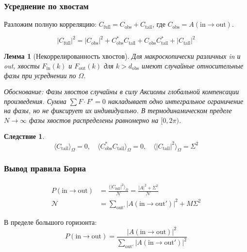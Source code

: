 \documentclass[12pt,a4paper]{article}
\newtheorem{lemma}{Лемма}[section]
\newtheorem{corollary}{Следствие}[section]
\begin{document}
\subsubsection{Усреднение по хвостам}

Разложим полную корреляцию: $C_{\text{full}} = C_{\text{obs}} + C_{\text{tail}}$, где $C_{\text{obs}} = A(\text{in} \to \text{out})$.

\begin{equation}
    |C_{\text{full}}|^2 = |C_{\text{obs}}|^2 + C_{\text{obs}}^* C_{\text{tail}} + C_{\text{obs}} C_{\text{tail}}^* + |C_{\text{tail}}|^2
\end{equation}

\begin{lemma}[Некоррелированность хвостов]
Для макроскопически различных in и out, хвосты $F_{\text{in}}(k)$ и $F_{\text{out}}(k)$ для $k > d_{\text{obs}}$ имеют случайные относительные фазы при усреднении по $\Omega$.

Обоснование: Фазы хвостов случайны в силу Аксиомы глобальной компенсации произведения. Сумма $\sum F \cdot F' = 0$ накладывает одно интегральное ограничение на фазы, но не фиксирует их индивидуально. В термодинамическом пределе $N \to \infty$ фазы хвостов распределены равномерно на $[0, 2\pi)$.
\end{lemma}

\begin{corollary}
\begin{equation}
    \langle C_{\text{tail}} \rangle_\Omega = 0, \quad \langle C_{\text{obs}}^* C_{\text{tail}} \rangle_\Omega = 0, \quad \langle |C_{\text{tail}}|^2 \rangle_\Omega = \Sigma^2
\end{equation}
\end{corollary}

\subsubsection{Вывод правила Борна}

\begin{align}
    P(\text{in} \to \text{out}) &= \frac{\langle |C_{\text{full}}|^2 \rangle_\Omega}{\mathcal{N}} = \frac{|A|^2 + \Sigma^2}{\mathcal{N}} \\
    \mathcal{N} &= \sum_{\text{out}'} |A(\text{in} \to \text{out}')|^2 + M\Sigma^2
\end{align}

В пределе большого горизонта:
\begin{equation}
    \boxed{P(\text{in} \to \text{out}) = \frac{|A(\text{in} \to \text{out})|^2}{\sum_{\text{out}'} |A(\text{in} \to \text{out}')|^2}}
\end{equation}
\end{document}
